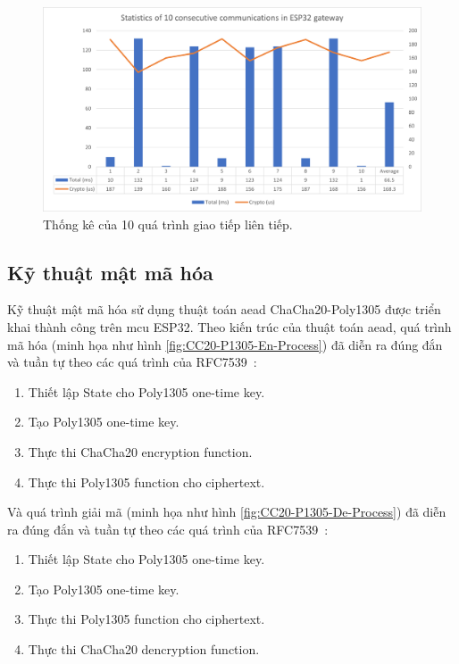 \begin{figure}[htp]
\centering
\includegraphics[width=1.0\linewidth]{images/fig-10-measure-commu-physic.png}
\caption{Thống kê của 10 quá trình giao tiếp liên tiếp.}
\label{fig:10-measure-commu-physic}
\end{figure}

\subsection{Kỹ thuật mật mã hóa}
Kỹ thuật mật mã hóa sử dụng thuật toán \acrshort{aead} ChaCha20-Poly1305 được triển khai thành công trên \acrshort{mcu} ESP32. Theo kiến trúc của thuật toán \acrshort{aead}, quá trình mã hóa (minh họa như hình \ref{fig:CC20-P1305-En-Process}) đã diễn ra đúng đắn và tuần tự theo các quá trình của RFC7539~\cite{rfc7539}:

\begin{enumerate}
    \item Thiết lập State cho Poly1305 one-time key.
    \item Tạo Poly1305 one-time key.
    \item Thực thi ChaCha20 encryption function.
    \item Thực thi Poly1305 function cho ciphertext.
\end{enumerate}

Và quá trình giải mã (minh họa như hình \ref{fig:CC20-P1305-De-Process}) đã diễn ra đúng đắn và tuần tự theo các quá trình của RFC7539~\cite{rfc7539}:

\begin{enumerate}
    \item Thiết lập State cho Poly1305 one-time key.
    \item Tạo Poly1305 one-time key.
    \item Thực thi Poly1305 function cho ciphertext.
    \item Thực thi ChaCha20 dencryption function.
\end{enumerate}


